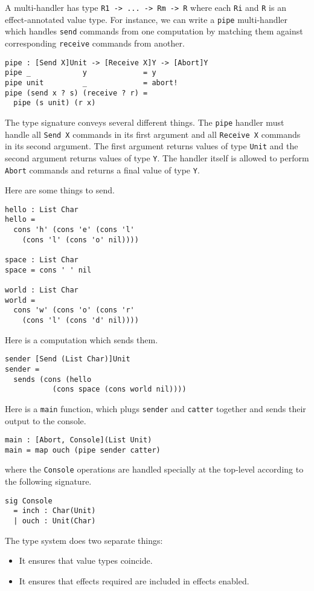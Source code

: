\documentclass[preprint]{sigplanconf}
\begin{document}
A multi-handler has type \verb!R1 -> ... -> Rm -> R! where each
\verb!Ri! and \verb!R! is an effect-annotated value type. For
instance, we can write a \verb!pipe! multi-handler which handles
\verb!send! commands from one computation by matching them against
corresponding \verb!receive! commands from another.
%
\begin{verbatim}
pipe : [Send X]Unit -> [Receive X]Y -> [Abort]Y
pipe _            y             = y
pipe unit         _             = abort!
pipe (send x ? s) (receive ? r) =
  pipe (s unit) (r x)
\end{verbatim}
%
The type signature conveys several different things. The \verb!pipe!
  handler must handle all \verb!Send X! commands in its first argument
  and all \verb!Receive X! commands in its second argument. The first
  argument returns values of type \verb!Unit! and the second argument
  returns values of type \verb!Y!. The handler itself is allowed to
  perform \verb!Abort!  commands and returns a final value of type
  \verb!Y!.

Here are some things to send.
\begin{verbatim}
hello : List Char
hello =
  cons 'h' (cons 'e' (cons 'l'
    (cons 'l' (cons 'o' nil))))

space : List Char
space = cons ' ' nil

world : List Char
world =
  cons 'w' (cons 'o' (cons 'r'
    (cons 'l' (cons 'd' nil))))
\end{verbatim}
%
Here is a computation which sends them.
%
\begin{verbatim}
sender [Send (List Char)]Unit
sender =
  sends (cons (hello
           (cons space (cons world nil))))
\end{verbatim}

Here is a \verb!main! function, which plugs \verb!sender! and
\verb!catter!  together and sends their output to the console.
%
\begin{verbatim}
main : [Abort, Console](List Unit)
main = map ouch (pipe sender catter)
\end{verbatim}
where the \verb!Console! operations are handled specially at the
top-level according to the following signature.
\begin{verbatim}
sig Console
  = inch : Char(Unit)
  | ouch : Unit(Char)
\end{verbatim}

The type system does two separate things:
\begin{itemize}
\item It ensures that value types coincide.
\item It ensures that effects required are included in effects
  enabled.
\end{itemize}
\end{document}
